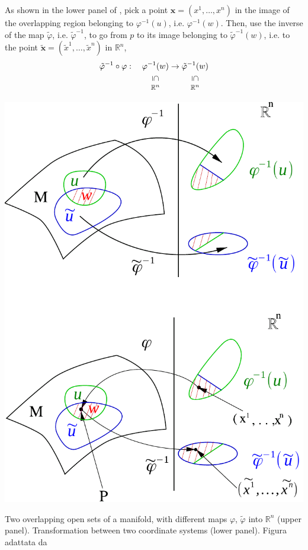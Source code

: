 \documentclass[../main.tex]{subfiles}
\begin{document}
As shown in the lower panel of , pick a point $\mathbf{x}=(x^1,\dots,x^n)$ in the image of the
overlapping region belonging to $\varphi^{-1}(u)$, i.e. $\varphi^{-1}(w)$. Then, use the inverse of the map $\tilde\varphi$, i.e. $\tilde{\varphi}^{-1}$, to go from $p$ to its image belonging to  $\tilde{\varphi}^{-1}(w)$, i.e. to
the point $\tilde{\mathbf{x}}=(\tilde{x}^1,\dots,\tilde{x}^n)$ in $\mathbb{R}^n$,
\[
\tilde{\varphi}^{-1}\circ\varphi: \quad  \underset{\mathclap{\tikz \node {\rotatebox{-90}{$\subseteq$}} node [below=1ex] {\footnotesize $\mathbb{R}^n$};}}{\varphi^{-1}(w)} \to\underset{\mathclap{\tikz \node {\rotatebox{-90}{$\subseteq$}} node [below=1ex] {\footnotesize $\mathbb{R}^n$};}}{\tilde{\varphi}^{-1}(w)}
\]
\begin{marginfigure}
	\includegraphics{images/coordinate_change.pdf}
	\caption[Coordinate transformation]{Two overlapping open sets of a manifold, with different maps $\varphi$, $\tilde{\varphi}$ into $\mathbb{R}^n$ (upper panel). Transformation between two coordinate systems (lower panel). Figura adattata da \cite{ferrari2020general}}
\end{marginfigure} 
\end{document}
